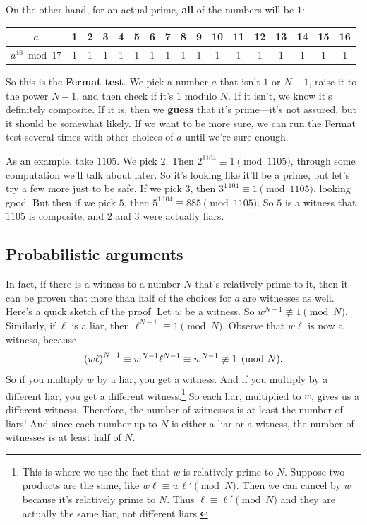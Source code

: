 \documentclass[11pt,paper=letter]{scrartcl}
\begin{document}
On the other hand, for an actual prime, \textbf{all} of the numbers will be $1$:

\begin{center}
  \begin{tabular}{c|cccccccccccccccc}
  $a$ & 1 & 2 & 3 & 4 & 5 & 6 & 7 & 8 & 9 & 10 & 11 & 12 & 13 & 14 & 15 & 16 \\ \hline
  $a^{16}\bmod 17$ & 1 & 1 & 1 & 1 & 1 & 1 & 1 & 1 & 1 & 1 & 1 & 1 & 1 & 1 & 1 & 1
  \end{tabular}
\end{center}

So this is the \textbf{Fermat test}. We pick a number $a$ that isn't $1$ or $N-1$, raise it to the power $N - 1$, and then check if it's $1$ modulo $N$. If it isn't, we know it's definitely composite. If it is, then we \textbf{guess} that it's prime---it's not assured, but it should be somewhat likely. If we want to be more sure, we can run the Fermat test several times with other choices of $a$ until we're sure enough.

As an example, take $1105$. We pick $2$. Then $2^{1104} \equiv 1 \pmod{1105}$, through some computation we'll talk about later. So it's looking like it'll be a prime, but let's try a few more just to be safe. If we pick $3$, then $3^{1\,104} \equiv 1 \pmod{1105}$, looking good. But then if we pick $5$, then $5^{1\,104} \equiv 885 \pmod{1105}$. So $5$ is a witness that $1105$ is composite, and $2$ and $3$ were actually liars.

\subsection{Probabilistic arguments}

In fact, if there is a witness to a number $N$ that's relatively prime to it, then it can be proven that more than half of the choices for $a$ are witnesses as well. Here's a quick sketch of the proof. Let $w$ be a witness. So $w^{N-1} \not \equiv 1 \pmod{N}$. Similarly, if $\ell$ is a liar, then $\ell^{N-1} \equiv 1 \pmod{N}$. Observe that $w\ell$ is now a witness, because
$$\left( w\ell \right)^{N-1} \equiv w^{N-1} \ell^{N-1} \equiv w^{N-1} \not\equiv 1 \pmod{N}.$$
So if you multiply $w$ by a liar, you get a witness. And if you multiply by a different liar, you get a different witness.\footnote{This is where we use the fact that $w$ is relatively prime to $N$. Suppose two products are the same, like $w\ell \equiv w\ell' \pmod N$. Then we can cancel by $w$ because it's relatively prime to $N$. Thus $\ell \equiv \ell' \pmod N$ and they are actually the same liar, not different liars.} So each liar, multiplied to $w$, gives us a different witness. Therefore, the number of witnesses is at least the number of liars! And since each number up to $N$ is either a liar or a witness, the number of witnesses is at least half of $N$.
\end{document}
